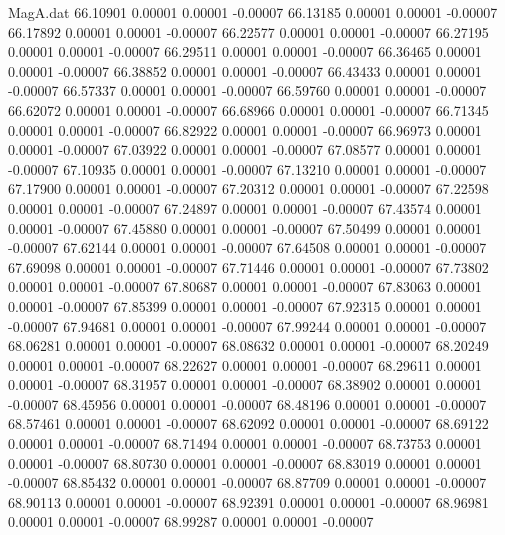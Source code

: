 \begin{filecontents}{MagA.dat}
  66.10901    0.00001    0.00001   -0.00007
  66.13185    0.00001    0.00001   -0.00007
  66.17892    0.00001    0.00001   -0.00007
  66.22577    0.00001    0.00001   -0.00007
  66.27195    0.00001    0.00001   -0.00007
  66.29511    0.00001    0.00001   -0.00007
  66.36465    0.00001    0.00001   -0.00007
  66.38852    0.00001    0.00001   -0.00007
  66.43433    0.00001    0.00001   -0.00007
  66.57337    0.00001    0.00001   -0.00007
  66.59760    0.00001    0.00001   -0.00007
  66.62072    0.00001    0.00001   -0.00007
  66.68966    0.00001    0.00001   -0.00007
  66.71345    0.00001    0.00001   -0.00007
  66.82922    0.00001    0.00001   -0.00007
  66.96973    0.00001    0.00001   -0.00007
  67.03922    0.00001    0.00001   -0.00007
  67.08577    0.00001    0.00001   -0.00007
  67.10935    0.00001    0.00001   -0.00007
  67.13210    0.00001    0.00001   -0.00007
  67.17900    0.00001    0.00001   -0.00007
  67.20312    0.00001    0.00001   -0.00007
  67.22598    0.00001    0.00001   -0.00007
  67.24897    0.00001    0.00001   -0.00007
  67.43574    0.00001    0.00001   -0.00007
  67.45880    0.00001    0.00001   -0.00007
  67.50499    0.00001    0.00001   -0.00007
  67.62144    0.00001    0.00001   -0.00007
  67.64508    0.00001    0.00001   -0.00007
  67.69098    0.00001    0.00001   -0.00007
  67.71446    0.00001    0.00001   -0.00007
  67.73802    0.00001    0.00001   -0.00007
  67.80687    0.00001    0.00001   -0.00007
  67.83063    0.00001    0.00001   -0.00007
  67.85399    0.00001    0.00001   -0.00007
  67.92315    0.00001    0.00001   -0.00007
  67.94681    0.00001    0.00001   -0.00007
  67.99244    0.00001    0.00001   -0.00007
  68.06281    0.00001    0.00001   -0.00007
  68.08632    0.00001    0.00001   -0.00007
  68.20249    0.00001    0.00001   -0.00007
  68.22627    0.00001    0.00001   -0.00007
  68.29611    0.00001    0.00001   -0.00007
  68.31957    0.00001    0.00001   -0.00007
  68.38902    0.00001    0.00001   -0.00007
  68.45956    0.00001    0.00001   -0.00007
  68.48196    0.00001    0.00001   -0.00007
  68.57461    0.00001    0.00001   -0.00007
  68.62092    0.00001    0.00001   -0.00007
  68.69122    0.00001    0.00001   -0.00007
  68.71494    0.00001    0.00001   -0.00007
  68.73753    0.00001    0.00001   -0.00007
  68.80730    0.00001    0.00001   -0.00007
  68.83019    0.00001    0.00001   -0.00007
  68.85432    0.00001    0.00001   -0.00007
  68.87709    0.00001    0.00001   -0.00007
  68.90113    0.00001    0.00001   -0.00007
  68.92391    0.00001    0.00001   -0.00007
  68.96981    0.00001    0.00001   -0.00007
  68.99287    0.00001    0.00001   -0.00007

\end{filecontents}
